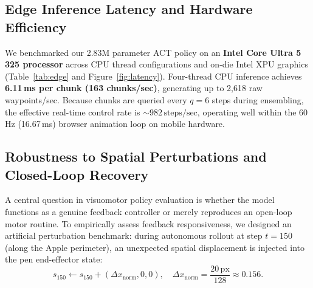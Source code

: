 \documentclass[10pt,twocolumn,letterpaper]{article}
\begin{document}
\begin{table}[t]
  \centering
  \caption{Inference latency and throughput on an Intel Core Ultra 5 325 edge processor (Batch Size = 1, $K=16$).}
  \label{tab:edge}
  \footnotesize
  \renewcommand{\arraystretch}{0.95}
  \setlength{\tabcolsep}{3.5pt}
\end{table}

\subsection{Edge Inference Latency and Hardware Efficiency}
We benchmarked our 2.83M parameter ACT policy on an \textbf{Intel Core Ultra 5 325 processor} across CPU thread configurations and on-die Intel XPU graphics (Table~\ref{tab:edge} and Figure~\ref{fig:latency}). Four-thread CPU inference achieves \textbf{6.11\,ms per chunk (163 chunks/sec)}, generating up to 2,618 raw waypoints/sec. Because chunks are queried every $q=6$ steps during ensembling, the effective real-time control rate is $\sim 982\,\text{steps/sec}$, operating well within the 60\,Hz (16.67\,ms) browser animation loop on mobile hardware.

\subsection{Robustness to Spatial Perturbations and Closed-Loop Recovery}
A central question in visuomotor policy evaluation is whether the model functions as a genuine feedback controller or merely reproduces an open-loop motor routine. To empirically assess feedback responsiveness, we designed an artificial perturbation benchmark: during autonomous rollout at step $t=150$ (along the Apple perimeter), an unexpected spatial displacement is injected into the pen end-effector state:
\begin{equation}
  s_{150} \leftarrow s_{150} + (\Delta x_{\text{norm}}, 0, 0), \quad \Delta x_{\text{norm}} = \frac{20\,\text{px}}{128} \approx 0.156.
\end{equation}
\end{document}
